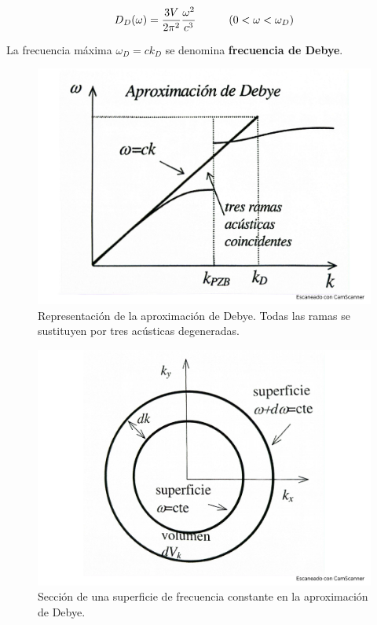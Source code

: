 \begin{mybox}
\begin{equation}
	D_D (\omega) = \frac{3V}{2\pi^2} \frac{\omega^2}{c^3} \quad \quad \quad (0<\omega<\omega_D)
    \label{Ec:05-01-07}
\end{equation}
\end{mybox}
La frecuencia máxima $\omega_D=ck_D$ se denomina \textbf{frecuencia de Debye}. 


\begin{figure}[h!] \centering
    \includegraphics[scale=0.35]{Cuerpo/Ch_05/Fotos libro 2.pdf}
    \caption{Representación de la aproximación de Debye. Todas las ramas se sustituyen por tres acústicas degeneradas.}
    \label{Fig:05-02}
\end{figure}



\begin{figure}[h!] \centering
    \includegraphics[scale=0.35]{Cuerpo/Ch_05/Fotos libro 3.pdf}
    \caption{Sección de una superficie de frecuencia constante en la aproximación de Debye.}
    \label{Fig:05-03}
\end{figure}    

